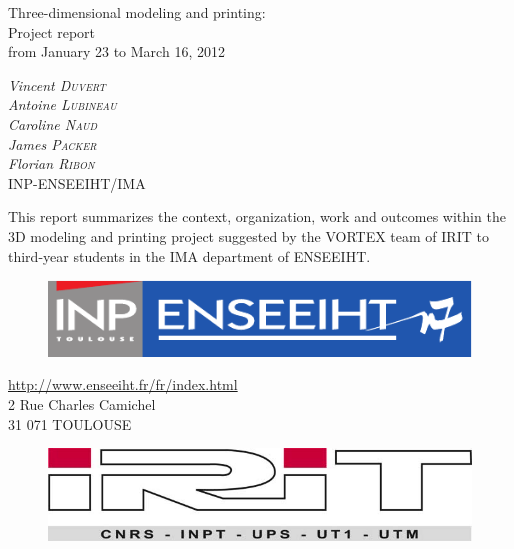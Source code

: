\documentclass{report}
\begin{document}
\bigskip
\bigskip
\bigskip
\bigskip
\bigskip
\bigskip
\bigskip
\bigskip

\begin{center}
\huge{Three-dimensional modeling and printing:\\ Project report\\}
\bigskip
\bigskip
\Large{from January 23 to March 16, 2012}
\end{center}

\bigskip
\bigskip

\begin{center}
\large{
\textit{Vincent \textsc{Duvert} \\
Antoine \textsc{Lubineau} \\
Caroline \textsc{Naud} \\
James \textsc{Packer} \\
Florian \textsc{Ribon}} \\
\bigskip
INP-ENSEEIHT/IMA 
}
\end{center}

\bigskip
\bigskip

	This report summarizes the context, organization, work and outcomes within the 3D modeling and printing project suggested by the VORTEX team of IRIT to third-year students in the IMA department of ENSEEIHT.

\bigskip
\bigskip

\begin{figure}[!h]
\begin{center}
	\includegraphics[scale=0.4]{inp-enseeiht}
\end{center}
\end{figure}

\bigskip

\begin{center}
\url{http://www.enseeiht.fr/fr/index.html} \\
2 Rue Charles Camichel \\
31 071 TOULOUSE
\end{center}

\vfill

\begin{figure}[!h]
\begin{center}
	\includegraphics[scale=0.4]{irit}
\end{center}
\end{figure}
\end{document}
